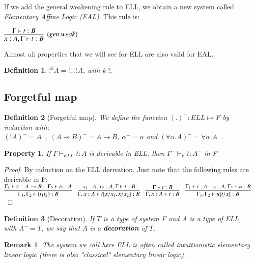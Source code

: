 \documentclass[a4paper,10pt]{article}
\newcommand{\impl}{\rightarrow}	%
\newcommand{\limpl}{\multimap}  %
\newtheorem{definition}{Definition}
\newtheorem{prop}{Property}
\newtheorem{rmk}{Remark}
\begin{document}
 If we add the general weakening rule to ELL, we obtain a new system called \emph{Elementary Affine Logic (EAL)}. This rule is:
\begin{center}
$\infer[(gen.weak)]{x:A, \Gamma \vdash t:B}{\Gamma \vdash t:B }$
\end{center}

Almost all properties that we will see for ELL are also valid for EAL.

\begin{definition}
$!^k A = !...! A$, with k $!$.
\end{definition}



\subsection{Forgetful map}

\begin{definition}[Forgetful map]
 We define the function $(.)^{-} : ELL \mapsto F$ by induction with:\\
$(!A)^{-} = A^{-}$, $(A \limpl B)^{-} = A \impl B$, $\alpha^{-} = \alpha$ and $(\forall \alpha.A)^{-} = \forall \alpha.A^{-}$.
\end{definition}

\begin{prop}
 If $\Gamma \vdash_{ELL} t:A$ is derivable in ELL, then $\Gamma^{-} \vdash_{F} t:A^{-}$ in F
\end{prop}
\begin{proof}
By induction on the ELL derivation. Just note that the following rules are derivable in F:\\
$	\infer{\Gamma_1 , \Gamma_2 \vdash (t_1 t_2):B}{\Gamma_1 \vdash t_1 :A \impl B & \Gamma_2 \vdash t_2 : A } \quad
	\infer{\Gamma, x:A \vdash t[x/x_1 , x/x_2] : B}{x_1 :A, x_2 :A, \Gamma \vdash t:B} \quad
	\infer{\Gamma , x:A \vdash t : B}{\Gamma \vdash t : B} \quad
	\infer{\Gamma_1, \Gamma_2 \vdash u[t/x] : B}{\Gamma_1 \vdash t:A  &  x:A,\Gamma_2 \vdash u:B} $
\end{proof}

\begin{definition}[Decoration]
If $T$ is a type of system F and $A$ is a type of ELL, with $A^{-}=T$, we say that $A$ is a \textbf{decoration} of $T$.
\end{definition}

\begin{rmk}
The system we call here ELL is often called intuitionistic elementary linear logic (there is also "classical" elementary linear logic).
\end{rmk}
\end{document}
